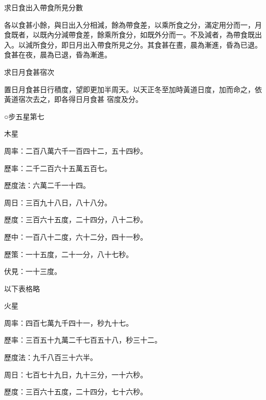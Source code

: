 \begin{pinyinscope}
 求日食出入帶食所見分數



 各以食甚小餘，與日出入分相減，餘為帶食差，以乘所食之分，滿定用分而一，月食既者，以既內分減帶食差，餘乘所食分，如既外分而一。不及減者，為帶食既出入。以減所食分，即日月出入帶食所見之分。其食甚在晝，晨為漸進，昏為已退。食甚在夜，晨為已退，昏為漸進。



 求日月食甚宿次



 置日月食甚日行積度，望即更加半周天。以天正冬至加時黃道日度，加而命之，依黃道宿次去之，即各得日月食甚
 宿度及分。



 ○步五星第七



 木星



 周率：二百八萬六千一百四十二，五十四秒。



 歷率：二千二百六十五萬五百七。



 歷度法：六萬二千一十四。



 周日：三百九十八日，八十八分。



 歷度：三百六十五度，二十四分，八十二秒。



 歷中：一百八十二度，六十二分，四十一秒。



 歷策：一十五度，二十一分，八十七秒。



 伏見：一十三度。



 以下表格略



 火星



 周率：四百七萬九千四十一，秒九十七。



 歷率：三百五十九萬二千七百五十八，秒三十二。



 歷度法：九千八百三十六半。



 周日：七百七十九日，九十三分，一十六秒。



 歷度：三百六十五度，二十四分，七十六秒。




\end{pinyinscope}
